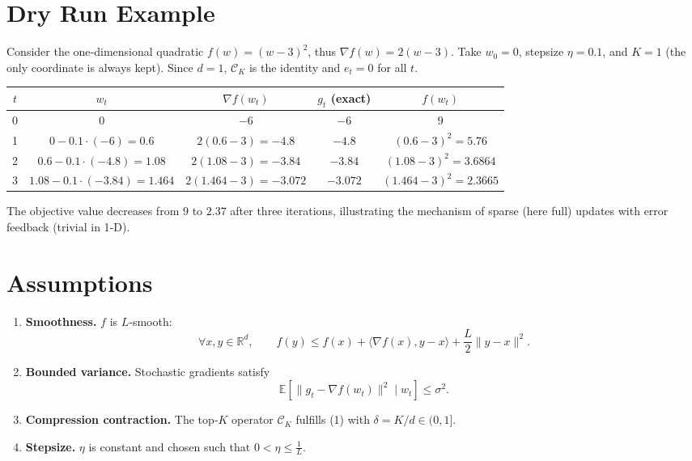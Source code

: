 \documentclass{article}
\newcommand{\E}{\mathbb{E}}
\newcommand{\R}{\mathbb{R}}
\newcommand{\inner}[2]{\langle #1,#2\rangle}
\begin{document}
\section*{Dry Run Example}
Consider the one‑dimensional quadratic $f(w)=(w-3)^{2}$, thus $\nabla f(w)=2(w-3)$.  
Take $w_{0}=0$, stepsize $\eta=0.1$, and $K=1$ (the only coordinate is always kept).  
Since $d=1$, $\mathcal C_{K}$ is the identity and $e_{t}=0$ for all $t$.

\begin{center}
\begin{tabular}{c|c|c|c|c}
$t$ & $w_{t}$ & $\nabla f(w_{t})$ & $g_{t}$ (exact) & $f(w_{t})$\\ \hline
0 & $0$ & $-6$ & $-6$ & $9$\\
1 & $0-0.1\cdot(-6)=0.6$ & $2(0.6-3)=-4.8$ & $-4.8$ & $(0.6-3)^{2}=5.76$\\
2 & $0.6-0.1\cdot(-4.8)=1.08$ & $2(1.08-3)=-3.84$ & $-3.84$ & $(1.08-3)^{2}=3.6864$\\
3 & $1.08-0.1\cdot(-3.84)=1.464$ & $2(1.464-3)=-3.072$ & $-3.072$ & $(1.464-3)^{2}=2.3665$\\
\end{tabular}
\end{center}
The objective value decreases from $9$ to $2.37$ after three iterations, illustrating the mechanism of sparse (here full) updates with error feedback (trivial in 1‑D).

\newpage
\section*{Assumptions}
\begin{enumerate}
\item \textbf{Smoothness.} $f$ is $L$‑smooth:
\[
\forall x,y\in\R^{d},\qquad 
f(y)\le f(x)+\inner{\nabla f(x)}{y-x}+\frac{L}{2}\|y-x\|^{2}.
\tag{A1}
\]
\item \textbf{Bounded variance.} Stochastic gradients satisfy
\[
\E\!\left[\|g_{t}-\nabla f(w_{t})\|^{2}\mid w_{t}\right]\le\sigma^{2}.
\tag{A2}
\]
\item \textbf{Compression contraction.} The top‑$K$ operator $\mathcal C_{K}$ fulfills (1) with
$\delta=K/d\in(0,1]$.
\item \textbf{Stepsize.} $\eta$ is constant and chosen such that $0<\eta\le \frac{1}{L}$.
\end{enumerate}
\end{document}

